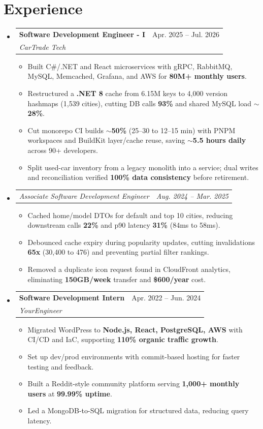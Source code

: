 \documentclass[letterpaper,11pt]{article}
\makeatletter
\newcommand{\resumeItem}[1]{
  \item\small{
    {#1 \vspace{-2pt}}
  }
}
\newcommand{\resumeSubheading}[4]{
  \vspace{-2pt}\item
    \begin{tabular*}{0.97\textwidth}[t]{l@{\extracolsep{\fill}}r}
      \textbf{#1} & #2 \\
      \textit{\small#3} & \textit{\small #4} \\
    \end{tabular*}\vspace{-7pt}
}
\newcommand{\resumeSubSubheading}[2]{
    \item
    \begin{tabular*}{0.97\textwidth}{l@{\extracolsep{\fill}}r}
      \textit{\small#1} & \textit{\small #2} \\
    \end{tabular*}\vspace{-7pt}
}
\newcommand{\resumeSubHeadingListStart}{\begin{itemize}[leftmargin=0.15in, label={}]}
\newcommand{\resumeSubHeadingListEnd}{\end{itemize}}
\newcommand{\resumeItemListStart}{\begin{itemize}}
\newcommand{\resumeItemListEnd}{\end{itemize}\vspace{-5pt}}
\makeatother
\begin{document}
\section{Experience}
\resumeSubHeadingListStart
\resumeSubheading
{Software Development Engineer - I}{Apr. 2025 -- Jul. 2026}
{CarTrade Tech}{ }
\resumeItemListStart
\resumeItem{Built C\#/.NET and React microservices with gRPC, RabbitMQ, MySQL, Memcached, Grafana, and AWS for \textbf{80M+ monthly users}.}
\resumeItem{Restructured a \textbf{.NET 8} cache from 6.15M keys to 4,000 version hashmaps (1,539 cities), cutting DB calls \textbf{93\%} and shared MySQL load \textbf{$\sim$28\%}.}
\resumeItem{Cut monorepo CI builds \textbf{$\sim$50\%} (25--30 to 12--15 min) with PNPM workspaces and BuildKit layer/cache reuse, saving \textbf{$\sim$5.5 hours daily} across 90+ developers.}
\resumeItem{Split used-car inventory from a legacy monolith into a service; dual writes and reconciliation verified \textbf{100\% data consistency} before retirement.}
\resumeItemListEnd
\resumeSubSubheading{Associate Software Development Engineer}{Aug. 2024 -- Mar. 2025}
\resumeItemListStart
\resumeItem{Cached home/model DTOs for default and top 10 cities, reducing downstream calls \textbf{22\%} and p90 latency \textbf{31\%} (84ms to 58ms).}
\resumeItem{Debounced cache expiry during popularity updates, cutting invalidations \textbf{65x} (30,400 to 476) and preventing partial filter rankings.}
\resumeItem{Removed a duplicate icon request found in CloudFront analytics, eliminating \textbf{150GB/week} transfer and \textbf{\$600/year} cost.}
\resumeItemListEnd
\resumeSubheading{Software Development Intern}{Apr. 2022 -- Jun. 2024}{YourEngineer}{ }
\resumeItemListStart
\resumeItem{Migrated WordPress to \textbf{Node.js, React, PostgreSQL, AWS} with CI/CD and IaC, supporting \textbf{110\% organic traffic growth}.}
\resumeItem{Set up dev/prod environments with commit-based hosting for faster testing and feedback.}
\resumeItem{Built a Reddit-style community platform serving \textbf{1,000+ monthly users} at \textbf{99.99\% uptime}.}
\resumeItem{Led a MongoDB-to-SQL migration for structured data, reducing query latency.}
\resumeItemListEnd
\resumeSubHeadingListEnd

\end{document}
